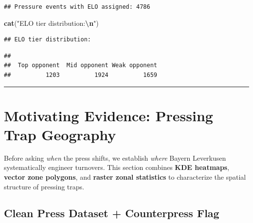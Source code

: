 \documentclass[
]{article}
\newenvironment{Shaded}{\begin{snugshade}}{\end{snugshade}}
\newcommand{\FunctionTok}[1]{\textcolor[rgb]{0.13,0.29,0.53}{\textbf{#1}}}
\newcommand{\NormalTok}[1]{#1}
\newcommand{\SpecialCharTok}[1]{\textcolor[rgb]{0.81,0.36,0.00}{\textbf{#1}}}
\newcommand{\StringTok}[1]{\textcolor[rgb]{0.31,0.60,0.02}{#1}}
\begin{document}
\begin{verbatim}
## Pressure events with ELO assigned: 4786
\end{verbatim}

\begin{Shaded}
\begin{Highlighting}[]
\FunctionTok{cat}\NormalTok{(}\StringTok{"ELO tier distribution:}\SpecialCharTok{\textbackslash{}n}\StringTok{"}\NormalTok{)}
\end{Highlighting}
\end{Shaded}

\begin{verbatim}
## ELO tier distribution:
\end{verbatim}

\begin{Shaded}
\end{Shaded}

\begin{verbatim}
## 
##  Top opponent  Mid opponent Weak opponent 
##          1203          1924          1659
\end{verbatim}

\begin{center}\rule{0.5\linewidth}{0.5pt}\end{center}

\section{Motivating Evidence: Pressing Trap
Geography}\label{motivating-evidence-pressing-trap-geography}

Before asking \emph{when} the press shifts, we establish \emph{where}
Bayern Leverkusen systematically engineer turnovers. This section
combines \textbf{KDE heatmaps}, \textbf{vector zone polygons}, and
\textbf{raster zonal statistics} to characterize the spatial structure
of pressing traps.

\subsection{Clean Press Dataset + Counterpress
Flag}\label{clean-press-dataset-counterpress-flag}
\end{document}
